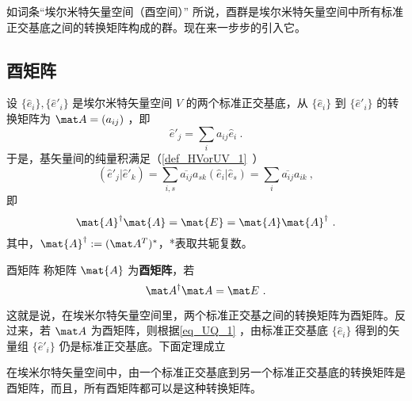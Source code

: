 
如词条“埃尔米特矢量空间（酉空间）” 所说，酉群是埃尔米特矢量空间中所有标准正交基底之间的转换矩阵构成的群。现在来一步步的引入它。
\subsection{酉矩阵}
设 $\{ \hat e_i\},\{  \hat e'_i\}$ 是埃尔米特矢量空间 $V$ 的两个标准正交基底，从 $\{ \hat e_i\}$ 到 $\{\hat e'_i\}$ 的转换矩阵为 $\mat A=(a_{ij})$ ，即
\begin{equation}\label{eq_UQ_1}
   \hat e'_j=\sum_{i}a_{ij} \hat e_i~.
\end{equation}
于是，基矢量间的纯量积满足（\autoref{def_HVorUV_1}~）
\begin{equation}
( \hat e'_j| \hat e'_k)=\sum_{i,s}\overline{a_{ij}}a_{sk}(\hat e_i|\hat e_s)=\sum_{i}\overline{a_{ij}}a_{ik}~,
\end{equation}
即
\begin{equation}\label{eq_UQ_2}
\mat{A}^\dagger \mat{A}=\mat{E}=\mat{A} \mat{A}^\dagger~.
\end{equation}
其中，$\mat{A}^\dagger:=(\mat A^T)^*$，*表取共轭复数。
\begin{definition}{酉矩阵}
称矩阵 $\mat{A}$ 为\textbf{酉矩阵}，若
\begin{equation}
\mat A^\dagger \mat A=\mat E~.
\end{equation}
\end{definition}
这就是说，在埃米尔特矢量空间里，两个标准正交基之间的转换矩阵为酉矩阵。反过来，若 $\mat A$ 为酉矩阵，则根据\autoref{eq_UQ_1} ，由标准正交基底 $\{\hat e_i\}$ 得到的矢量组 $\{\hat e'_i\}$ 仍是标准正交基底。下面定理成立
\begin{theorem}{}
在埃米尔特矢量空间中，由一个标准正交基底到另一个标准正交基底的转换矩阵是酉矩阵，而且，所有酉矩阵都可以是这种转换矩阵。
\end{theorem}
